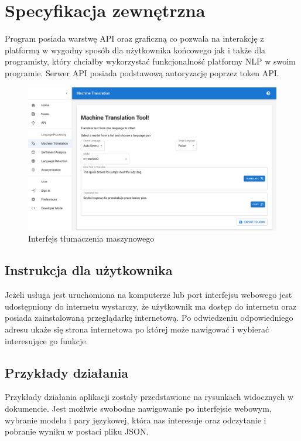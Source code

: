 \documentclass{article}
\begin{document}
\section{Specyfikacja zewnętrzna}

Program posiada warstwę API oraz graficzną co pozwala na interakcję z platformą w wygodny sposób dla użytkownika końcowego jak i także dla programisty, który chciałby wykorzystać funkcjonalność platformy NLP w swoim programie. Serwer API posiada podstawową autoryzację poprzez token API.

\begin{figure}[h!]
\centering
  \includegraphics[width=1\linewidth]{img/nlp-translate.png}
  \caption{\label{fig:nlp translation}Interfejs tłumaczenia maszynowego}
\end{figure}

\subsection{Instrukcja dla użytkownika}

Jeżeli usługa jest uruchomiona na komputerze lub port interfejsu webowego jest udostępniony do internetu wystarczy, że użytkownik ma dostęp do internetu oraz posiada zainstalowaną przeglądarkę internetową. Po odwiedzeniu odpowiedniego adresu ukaże się strona internetowa po której może nawigować i wybierać interesujące go funkcje.  

\subsection{Przykłady działania}

Przykłady działania aplikacji zostały przedstawione na rysunkach widocznych w dokumencie. Jest możlwie swobodne nawigowanie po interfejsie webowym, wybranie modelu i pary językowej, która nas interesuje oraz odczytanie i pobranie wyniku w postaci pliku JSON. 
\end{document}
